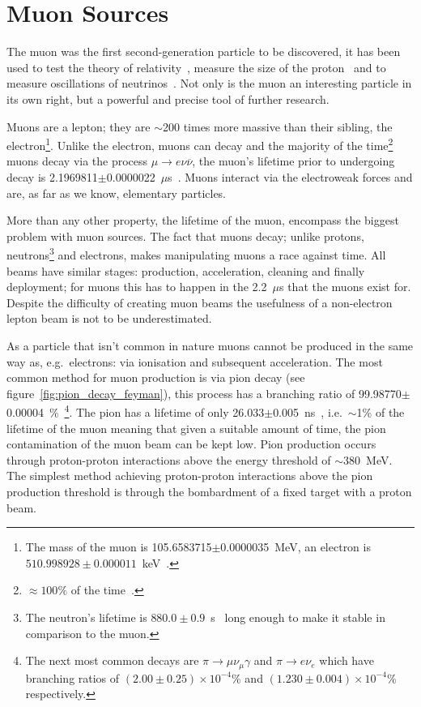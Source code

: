 \section{Muon Sources} %
\label{cha:high_intensity_muon_sources}
The muon was the first second-generation particle to be discovered, it has been used to test the theory of relativity~\cite{rossi_hall_first_muons}, measure the size of the proton~\cite{proton_size} and to measure oscillations of neutrinos~\cite{t2k_cdr}. Not only is the muon an interesting particle in its own right, but a powerful and precise tool of further research. 

Muons are a lepton; they are \(\sim\)200 times more massive than their sibling, the electron\footnote{The mass of the muon is 105.6583715\(\pm\)0.0000035~MeV, an electron is \( 510.998928\pm0.000011 \)~keV~\cite{pdg}.}. Unlike the electron, muons can decay and the majority of the time\footnote{\(\approx100\%\) of the time~\cite{pdg}.} muons decay via the process \(\mu\rightarrow e\nu\overline{\nu}\), the muon's lifetime prior to undergoing decay is 2.1969811\( \pm \)0.0000022~\( \mu \)s~\cite{pdg}. Muons interact via the electroweak forces and are, as far as we know, elementary particles.

More than any other property, the lifetime of the muon, encompass the biggest problem with muon sources. The fact that muons decay; unlike protons, neutrons\footnote{The neutron's lifetime is \(880.0\pm0.9\)~s~\cite{pdg} long enough to make it stable in comparison to the muon.} and electrons, makes manipulating muons a race against time. All beams have similar stages: production, acceleration, cleaning and finally deployment; for muons this has to happen in the 2.2~\(\mu\)s that the muons exist for. Despite the difficulty of creating muon beams the usefulness of a non-electron lepton beam is not to be underestimated.

As a particle that isn't common in nature muons cannot be produced in the same way as, e.g.\ electrons: via ionisation and subsequent acceleration. The most common method for muon production is via pion decay (see figure~\ref{fig:pion_decay_feyman}), this process has a branching ratio of 99.98770$\pm$0.00004~\%~\cite{pdg}\footnote{The next most common decays are \( \pi\rightarrow\mu\nu_{\mu}\gamma \) and \( \pi\rightarrow e \nu_e \) which have branching ratios of \( (2.00\pm0.25)\times10^{-4} \)\% and \( (1.230\pm0.004)\times10^{-4} \)\% respectively.}. The pion has a lifetime of only 26.033\(\pm\)0.005~ns~\cite{pdg}, i.e.\ \( \sim \)1\% of the lifetime of the muon meaning that given a suitable amount of time, the pion contamination of the muon beam can be kept low. Pion production occurs through proton-proton interactions above the energy threshold of \( \sim380 \)~MeV. The simplest method achieving proton-proton interactions above the pion production threshold is through the bombardment of a fixed target with a proton beam.

